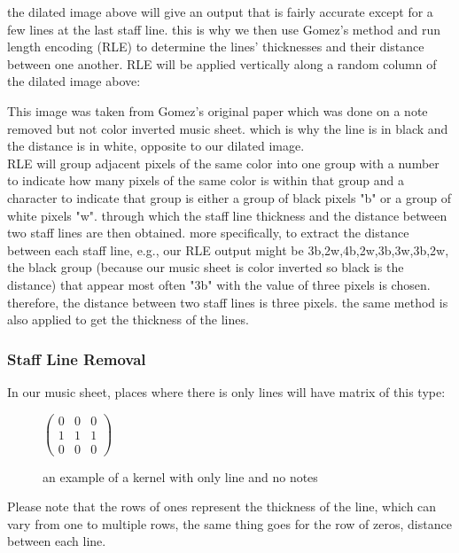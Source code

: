 \documentclass[final]{cvpr}
\begin{document}
the dilated image above will give an output that is fairly accurate except for a
few lines at the last staff line. this is why we then use Gomez's
method \cite{Gomez2017} and run length encoding (RLE) to determine the lines' thicknesses and
their distance between one another. RLE will be applied vertically along a
random column of the dilated image above:

\begin{figure}[ht]
\end{figure}

This image was taken from Gomez's original paper \cite{Gomez2017} which was done on a
note removed but not color inverted music sheet. which is why the line is in
black and the distance is in white, opposite to our dilated image.\\

RLE will group adjacent pixels of the same color into one group with a number to
indicate how many pixels of the same color is within that group and a character
to indicate that group is either a group of black pixels "b" or a group of white
pixels "w". through which the staff line thickness and the distance between two
staff lines are then obtained. more specifically, to extract the distance between each
staff line, e.g., our RLE output might be 3b,2w,4b,2w,3b,3w,3b,2w, the black
group (because our music sheet is color inverted so black is the distance) that
appear most often "3b" with the value of three pixels is chosen. therefore, the
distance between two staff lines is three pixels. the same method is also applied
to get the thickness of the lines.

\subsubsection{Staff Line Removal}
In our music sheet, places where there is only lines will have matrix of 
this type:

\begin{figure}[ht]
    \centering
    $
\begin{pmatrix}
	0 & 0 & 0\\
	1 & 1 & 1\\
	0 & 0 & 0
\end{pmatrix}
$\\
\caption{an example of a kernel with only line and no notes}
\label{line only matrix}
\end{figure}


Please note that the rows of ones represent the thickness of the line, which can
vary from one to multiple rows, the same thing goes for the row of zeros, distance
between each line.
\end{document}
